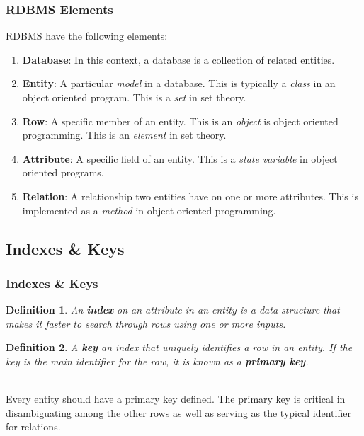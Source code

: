 \documentclass[aspectratio=169]{beamer}
\newtheorem{defn}{Definition}
\begin{document}
\begin{frame}
\frametitle{RDBMS Elements}
RDBMS have the following elements:
\begin{enumerate}
	\item \textbf{Database}: In this context, a database is a collection of related entities.
	\item \textbf{Entity}: A particular \emph{model} in a database. This is typically a \emph{class} in an object oriented program. This is a \emph{set} in set theory.
	\item \textbf{Row}: A specific member of an entity. This is an \emph{object} is object oriented programming. This is an \emph{element} in set theory.
	\item \textbf{Attribute}: A specific field of an entity. This is a \emph{state variable} in object oriented programs.
	\item \textbf{Relation}: A relationship two entities have on one or more attributes. This is implemented as a \emph{method} in object oriented programming.
\end{enumerate}
\end{frame}

\subsection{Indexes \& Keys}
\begin{frame}
\frametitle{Indexes \& Keys}
\begin{defn}
An \textbf{index} on an attribute in an entity is a data structure that makes it faster to search through rows using one or more inputs. 
\end{defn}
\begin{defn}
A \textbf{key} an index that uniquely identifies a row in an entity. If the key is the main identifier for the row, it is known as a \textbf{primary key}.
\end{defn}
\mbox{}\\
Every entity should have a primary key defined. The primary key is critical in disambiguating among the other rows as well as serving as the typical identifier for relations.
\end{frame}
\end{document}
